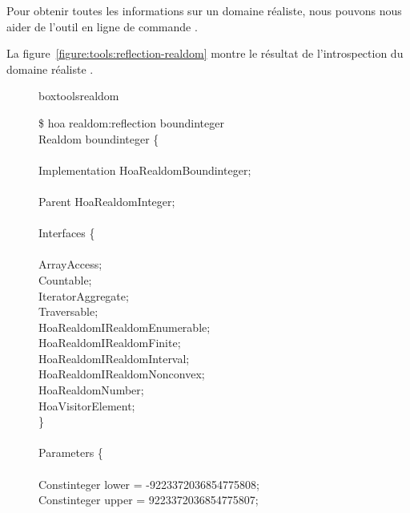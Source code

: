 Pour obtenir toutes les informations sur un domaine réaliste, nous pouvons nous
aider de l'outil en ligne de commande .

\begin{example}

La figure~\ref{figure:tools:reflection-realdom} montre le résultat de
l'introspection du domaine réaliste .
%
\begin{figure}

\begin{tikzbox}{boxtoolsrealdom}{}
\begin{bigpre}
\$ hoa realdom:reflection boundinteger \\
Realdom boundinteger \{ \\
 \\
    Implementation Hoa\bslash{}Realdom\bslash{}Boundinteger;  \\
 \\
    Parent Hoa\bslash{}Realdom\bslash{}Integer;  \\
 \\
    Interfaces \{  \\
 \\
        ArrayAccess; \\
        Countable; \\
        IteratorAggregate; \\
        Traversable; \\
        Hoa\bslash{}Realdom\bslash{}IRealdom\bslash{}Enumerable; \\
        Hoa\bslash{}Realdom\bslash{}IRealdom\bslash{}Finite; \\
        Hoa\bslash{}Realdom\bslash{}IRealdom\bslash{}Interval; \\
        Hoa\bslash{}Realdom\bslash{}IRealdom\bslash{}Nonconvex; \\
        Hoa\bslash{}Realdom\bslash{}Number; \\
        Hoa\bslash{}Visitor\bslash{}Element; \\
    \}  \\
 \\
    Parameters \{  \\
 \\
        [#0 optional] Constinteger lower = -9223372036854775808; \\
        [#1 optional] Constinteger upper = 9223372036854775807; \\

\end{bigpre}
\end{tikzbox}
\end{figure}
\end{example}
